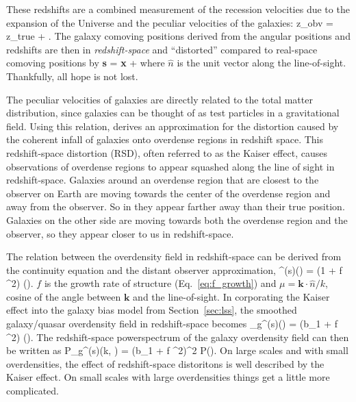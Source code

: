 These redshifts are a combined measurement of the recession velocities due to 
the expansion of the Universe and the peculiar velocities of the galaxies:
\beq
z_{obv} = z_{true} +  .
\eeq 
The galaxy comoving positions derived from the angular positions and redshifts are then
in {\em redshift-space} and ``distorted'' compared to real-space comoving positions by 
\beq
{\bf s} = {\bf x} +  
\eeq 
where $\hat{n}$ is the unit vector along the line-of-sight. Thankfully, all hope is not 
lost. 

The peculiar velocities of galaxies are directly related to the total 
matter distribution, since galaxies can be thought of as test particles in a 
gravitational field. Using this relation, \cite{Kaiser:1984aa} derives an 
approximation for the distortion caused by the coherent infall of galaxies 
onto overdense regions in redshift space. This redshift-space 
distortion (RSD), often referred to as the Kaiser effect, causes observations of 
overdense regions
to appear squashed along the line of sight in redshift-space. Galaxies around an
overdense region that are closest to the observer on Earth are moving towards the center of the 
overdense region and away from the observer. So in they appear farther away than 
their true position. Galaxies on the other side are moving towards both the overdense 
region and the observer, so they appear closer to us in redshift-space. 

The relation between the overdensity field in redshift-space can be 
derived from the continuity equation and the distant observer approximation, 
\beq
\delta^{(s)}() = (1 + f \mu^2) \delta().
\eeq
$f$ is the growth rate of structure (Eq.~\ref{eq:f_growth}) and 
$\mu = \bm{k} \cdot \hat{n} / k$, cosine of the angle between $\bm{k}$ and 
the line-of-sight. In corporating the Kaiser effect into the galaxy bias model 
from Section~\ref{sec:lss}, the smoothed galaxy/quasar overdensity field in 
redshift-space becomes
\beq
\delta_g^{(s)}() = (b_1 + f \mu^2) \delta().
\eeq
The redshift-space powerspectrum of the galaxy overdensity field can then be
written as 
\beq
P_g^{(s)}(k, \mu) = (b_1 + f \mu^2)^2 P().
\eeq
On large scales and with small overdensities, the effect of redshift-space 
distoritons is well described by the Kaiser effect. On small scales with large
overdensities things get a little more complicated. 

